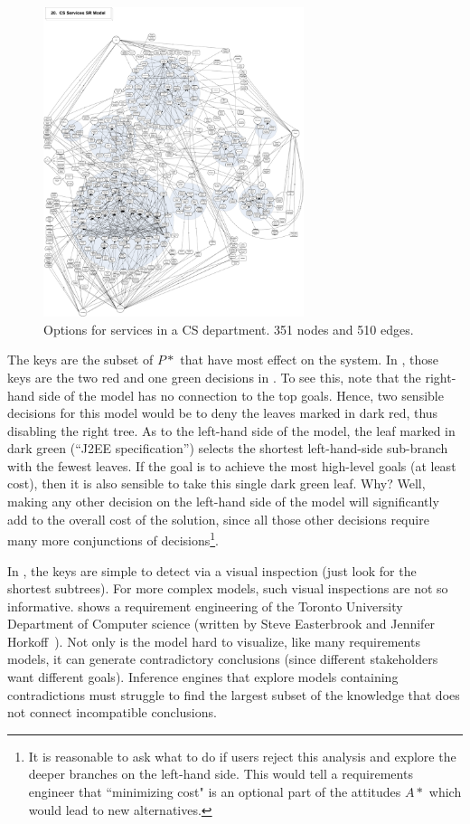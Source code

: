 \begin{figure}
    \includegraphics[width=3in]{fig/CSServices.pdf}
    \caption{Options for services in a CS department. 351 nodes and 510 edges.  }\label{fig:auto}
\end{figure} The keys
are the subset of $P*$ that have most effect on the system.
In  , those keys are 
the two red and one green decisions in . To see this, note that
the right-hand side of the model has no connection to the top goals. Hence,  two sensible
  decisions for this model would be to deny the leaves marked in dark red, thus disabling the right tree.
 As to the left-hand side of the model, the leaf marked in dark green (``J2EE specification'') selects
  the shortest left-hand-side sub-branch with the fewest leaves. If the goal is to achieve the most high-level goals
  (at least cost), then it is also sensible to take this single dark green leaf. Why? Well,   making any other decision
  on the  left-hand side of the model  will significantly add to the overall cost of the solution, since all those other decisions
  require many more conjunctions of decisions\footnote{It is reasonable to ask what to do if users reject this analysis  and  explore the deeper branches on the left-hand side.
  This would tell a requirements engineer that ``minimizing cost" is an optional part of the attitudes $A*$ which 
   would lead to new alternatives.}.
 

 In , the keys are simple to detect via a visual inspection (just look for the shortest subtrees). For more complex models, such visual inspections are not so informative.  
 shows a requirement engineering of the Toronto University Department of
Computer science (written by Steve Easterbrook and Jennifer Horkoff~\cite{mathew2017shorter}). Not only 
is the model hard to visualize, like many requirements models, it can generate
contradictory  conclusions (since different stakeholders want different goals).
Inference engines that explore  models containing contradictions
must struggle to find the largest subset of the knowledge that does not connect incompatible conclusions. 

